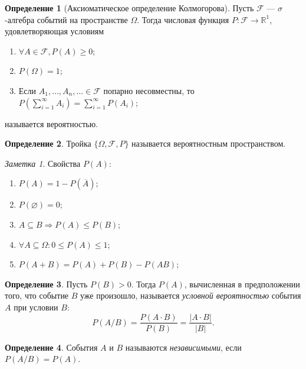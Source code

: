 \documentclass[a4paper,12pt]{article}
\let\emptyset\varnothing
\theoremstyle{remark}
\newtheorem*{note}{Заметка}
\theoremstyle{definition}
\newtheorem{definition}{Определение}
\begin{document}
\begin{definition}[Аксиоматическое определение Колмогорова]
	Пусть \(\mathcal{F}\) --- \(\sigma\)-алгебра событий на пространстве \(\Omega\). Тогда числовая функция \(P: \mathcal{F} \rightarrow \mathbb{R}^1\), удовлетворяющая условиям
	\begin{enumerate}
		\item \(\forall A \in \mathcal{F}, P(A) \geqslant 0\);
		\item \(P(\Omega) = 1\);
		\item Если \(A_1, \dots, A_n, \ldots \in \mathcal{F}\) попарно несовместны, то \(P \left(\sum^{\infty}_{i=1} A_i \right) = \sum^{\infty}_{i=1} P(A_i)\);
	\end{enumerate}
	называется вероятностью.
\end{definition}

\begin{definition}
	Тройка \(\{\Omega, \mathcal{F}, P\}\) называется вероятностным пространством.
\end{definition}

\begin{note}
Свойства \(P(A)\):
\begin{enumerate}
	\item \(P(A) = 1 - P(\overline{A})\);
	\item \(P(\emptyset) = 0\);
	\item \(A \subseteq B \Rightarrow P(A) \leqslant P(B)\);
	\item \(\forall A \subseteq \Omega: 0 \leqslant P(A) \leqslant 1\);
	\item \(P(A+B) = P(A) + P(B) - P(AB)\);
\end{enumerate}
\end{note}

\begin{definition}
	Пусть \(P(B) > 0\). Тогда \(P(A)\), вычисленная в предположении того, что событие \(B\) уже произошло, называется \emph{условной вероятностью} события \(A\) при условии \(B\):
	\begin{equation*}
		P(A / B) = \frac{P(A \cdot B)}{P(B)} = \frac{|A \cdot B|}{|B|}.
	\end{equation*}
\end{definition}

\begin{definition}
	События \(A\) и \(B\) называются \emph{независимыми}, если \(P(A/B) = P(A)\). 
\end{definition}
\end{document}
